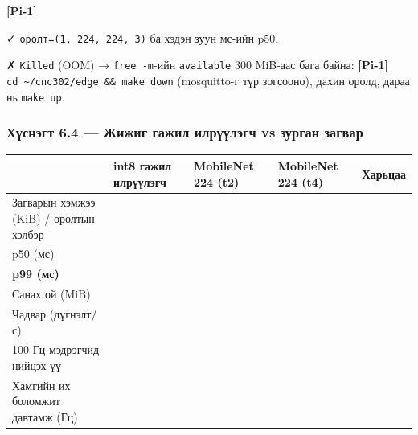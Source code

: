 \textbf{{[}Pi-1{]}}

\begin{Shaded}
\begin{Highlighting}[]
 \KeywordTok{\textbackslash{}}
    \KeywordTok{\textbackslash{}}
 \KeywordTok{\textbackslash{}}
    \KeywordTok{\textbackslash{}}
\end{Highlighting}
\end{Shaded}

✓ \texttt{оролт=\allowbreak{}(1,\ 224,\ 224,\ 3)} ба хэдэн зуун мс-ийн p50.

✗ \texttt{Killed} (OOM) → \texttt{free\ -m}-ийн \texttt{available} 300 MiB-аас бага байна: \textbf{{[}Pi-1{]}} \texttt{cd\ \textasciitilde{}/cnc302/edge\ \&\&\ make\ down} (mosquitto-г түр зогсооно), дахин оролд, дараа нь \texttt{make\ up}.

\hypertarget{ux445ux4afux441ux43dux44dux433ux442-6.4-ux436ux438ux436ux438ux433-ux433ux430ux436ux438ux43b-ux438ux43bux440ux4afux4afux43bux44dux433ux447-vs-ux437ux443ux440ux433ux430ux43d-ux437ux430ux433ux432ux430ux440}{%
\subsubsection{Хүснэгт 6.4 --- Жижиг гажил илрүүлэгч vs зурган загвар}\label{ux445ux4afux441ux43dux44dux433ux442-6.4-ux436ux438ux436ux438ux433-ux433ux430ux436ux438ux43b-ux438ux43bux440ux4afux4afux43bux44dux433ux447-vs-ux437ux443ux440ux433ux430ux43d-ux437ux430ux433ux432ux430ux440}}

\begingroup\scriptsize\begin{longtable}[]{@{}lllll@{}}
\toprule
& int8 гажил илрүүлэгч & MobileNet 224 (t2) & MobileNet 224 (t4) & Харьцаа\tabularnewline
\midrule
\endhead
Загварын хэмжээ (KiB) / оролтын хэлбэр & & & &\tabularnewline
p50 (мс) & & & &\tabularnewline
\textbf{p99 (мс)} & & & &\tabularnewline
Санах ой (MiB) & & & &\tabularnewline
Чадвар (дүгнэлт/с) & & & &\tabularnewline
100 Гц мэдрэгчид нийцэх үү & & & &\tabularnewline
Хамгийн их боломжит давтамж (Гц) & & & &\tabularnewline
\bottomrule
\end{longtable}\endgroup

